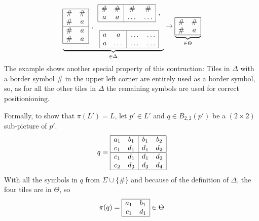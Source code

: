 \documentclass{article}
\begin{document}
$$\underbrace{
  \begin{array}{|cc|}
   \hline
   \# & \# \\
   \# & a \\
   \hline
   \# & a \\
   \# & a \\
   \hline
  \end{array}\ ,
  \begin{array}{c}
   \begin{array}{|cc|cc|}
   \hline
   \# & \# & \# & \# \\
   a & a & \dots & \dots \\
   \hline
  \end{array}\ ,\\  \\
  \begin{array}{|cc|cc|}
   \hline
   a & a & \dots & \dots \\
   a & \dots & \dots & \dots \\
   \hline
  \end{array}
  \end{array}}_{\in \Delta}\rightarrow
  \underbrace{\begin{array}{|cc|}
   \hline
   \# & \# \\
   \# & a \\
   \hline
  \end{array}}_{\in \Theta}
$$
The example shows another special property of this contruction: Tiles in $\Delta$ with a border symbol $\#$ in the upper left corner are entirely used as a border symbol, so, as for all the other tiles in $\Delta$ the remaining symbols are used for correct positionioning.

Formally, to show that $\pi(L') = L$, let $p' \in L'$ and $q \in B_{2,2}(p')$ be a $(2\times 2)$ sub-picture of $p'$.
$$q=\begin{array}{|cc|cc|}
     \hline
     a_1 & b_1 & b_1 & b_2 \\
     c_1 & d_1 & d_1 & d_2 \\
     \hline
     c_1 & d_1 & d_1 & d_2 \\
     c_2 & d_3 & d_3 & d_4 \\
     \hline
    \end{array}
$$
With all the symbols in $q$ from $\Sigma \cup \{\#\}$ and because of the definition of $\Delta$, the four tiles are in $\Theta$, so 
$$\pi(q) = 
\begin{array}{|cc|}
 \hline
 a_1 & b_1 \\
 c_1 & d_1\\
 \hline
\end{array}\in \Theta
$$
\end{document}

